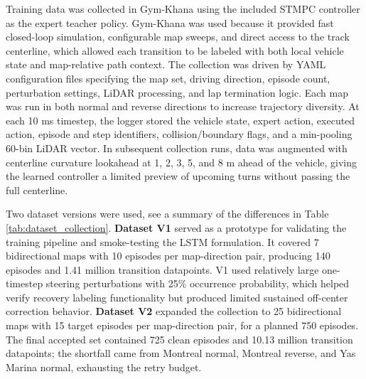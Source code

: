 \documentclass[conference]{IEEEtran}
\begin{document}




Training data was collected in Gym-Khana \cite{gymkhana_repo2026}  using the included STMPC controller as the expert teacher policy. Gym-Khana was used because it provided fast closed-loop simulation, configurable map sweeps, and direct access to the track centerline, which allowed each transition to be labeled with both local vehicle state and map-relative path context. The collection was driven by YAML configuration files specifying the map set, driving direction, episode count, perturbation settings, LiDAR processing, and lap termination logic. Each map was run in both normal and reverse directions to increase trajectory diversity. At each 10 ms timestep, the logger stored the vehicle state, expert action, executed action, episode and step identifiers, collision/boundary flags, and a min-pooling 60-bin LiDAR vector. In subsequent collection runs, data was augmented with centerline curvature lookahead at 1, 2, 3, 5, and 8 m ahead of the vehicle, giving the learned controller a limited preview of upcoming turns without passing the full centerline.

Two dataset versions were used, see a summary of the differences in Table~
\ref{tab:dataset_collection}. \textbf{Dataset V1} served as a prototype for validating the training pipeline and smoke-testing the LSTM formulation. It covered 7 bidirectional maps with 10 episodes per map-direction pair, producing 140 episodes and 1.41 million transition datapoints. V1 used relatively large one-timestep steering perturbations with 25\% occurrence probability, which helped verify recovery labeling functionality but produced limited sustained off-center correction behavior. \textbf{Dataset V2} expanded the collection to 25 bidirectional maps with 15 target episodes per map-direction pair, for a planned 750 episodes. The final accepted set contained 725 clean episodes and 10.13 million transition datapoints; the shortfall came from Montreal normal, Montreal reverse, and Yas Marina normal, exhausting the retry budget.
\end{document}
